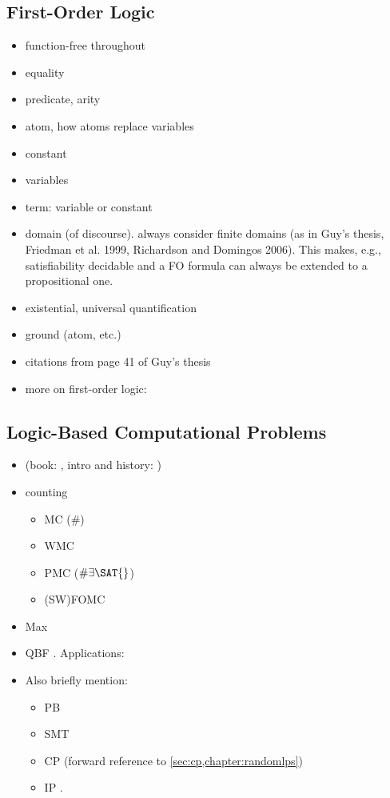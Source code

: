 \subsection{First-Order Logic}

\begin{itemize}
\item function-free throughout
\item equality
\item predicate, arity
\item atom, how atoms replace variables
\item constant
\item variables
\item term: variable or constant
\item domain (of discourse). always consider finite domains (as in Guy's thesis, Friedman et al. 1999, Richardson and Domingos 2006). This makes, e.g., satisfiability decidable and a FO formula can always be extended to a propositional one.
\item existential, universal quantification
\item ground (atom, etc.)
\item citations from page 41 of Guy's thesis
\item more on first-order logic: \citep{DBLP:books/daglib/0023546}
\end{itemize}

\subsection{Logic-Based Computational Problems}

\begin{itemize}
\item \SAT{} (book: \citep{DBLP:series/faia/2009-185}, intro and history: \citep{DBLP:series/faia/FrancoM09})
\item counting
  \begin{itemize}
  \item MC (\#\SAT{}) \citep{DBLP:series/faia/GomesSS09}
  \item WMC \citep{DBLP:journals/ai/ChaviraD08}
  \item PMC ($\#\exists\SAT{}$) \citep{DBLP:conf/sat/AzizCMS15}
  \item (SW)FOMC \citep{DBLP:conf/ijcai/BroeckTMDR11}
  \end{itemize}
\item Max\SAT{} \citep{bacchus2021maximum,DBLP:series/faia/LiM09}
\item QBF \citep{DBLP:series/faia/BuningB09}. Applications: \citep{DBLP:conf/ictai/ShuklaBPS19}
\item Also briefly mention:
  \begin{itemize}
  \item PB \citep{DBLP:series/faia/RousselM09}
  \item SMT \citep{DBLP:series/faia/BarrettSST09}
  \item CP \citep{DBLP:reference/fai/2} (forward reference to \cref{sec:cp,chapter:randomlps})
  \item IP \citep{wolsey2020integer}.
  \end{itemize}
\end{itemize}

